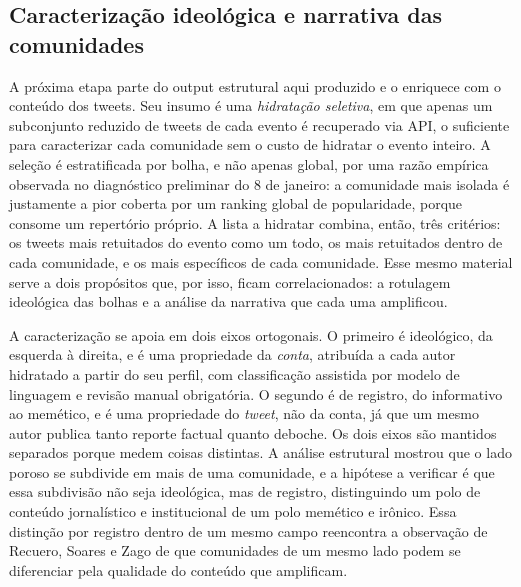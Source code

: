 \documentclass[conference]{IEEEtran}
\begin{document}
\subsection{Caracterização ideológica e narrativa das comunidades}
\label{sub:fut-caracterizacao}

A próxima etapa parte do output estrutural aqui produzido e o enriquece com o conteúdo dos tweets. Seu insumo é uma \emph{hidratação seletiva}, em que apenas um subconjunto reduzido de tweets de cada evento é recuperado via API, o suficiente para caracterizar cada comunidade sem o custo de hidratar o evento inteiro. A seleção é estratificada por bolha, e não apenas global, por uma razão empírica observada no diagnóstico preliminar do 8 de janeiro: a comunidade mais isolada é justamente a pior coberta por um ranking global de popularidade, porque consome um repertório próprio. A lista a hidratar combina, então, três critérios: os tweets mais retuitados do evento como um todo, os mais retuitados dentro de cada comunidade, e os mais específicos de cada comunidade. Esse mesmo material serve a dois propósitos que, por isso, ficam correlacionados: a rotulagem ideológica das bolhas e a análise da narrativa que cada uma amplificou.

A caracterização se apoia em dois eixos ortogonais. O primeiro é ideológico, da esquerda à direita, e é uma propriedade da \emph{conta}, atribuída a cada autor hidratado a partir do seu perfil, com classificação assistida por modelo de linguagem e revisão manual obrigatória. O segundo é de registro, do informativo ao memético, e é uma propriedade do \emph{tweet}, não da conta, já que um mesmo autor publica tanto reporte factual quanto deboche. Os dois eixos são mantidos separados porque medem coisas distintas. A análise estrutural mostrou que o lado poroso se subdivide em mais de uma comunidade, e a hipótese a verificar é que essa subdivisão não seja ideológica, mas de registro, distinguindo um polo de conteúdo jornalístico e institucional de um polo memético e irônico. Essa distinção por registro dentro de um mesmo campo reencontra a observação de Recuero, Soares e Zago \cite{b_recuero2021} de que comunidades de um mesmo lado podem se diferenciar pela qualidade do conteúdo que amplificam.
\end{document}
